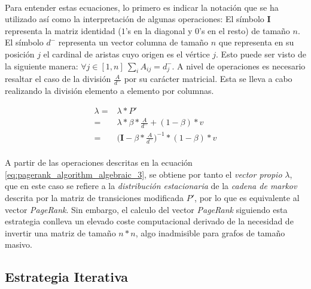 \documentclass{subfiles}
\begin{document}
        \paragraph{}
        Para entender estas ecuaciones, lo primero es indicar la notación que se ha utilizado así como la interpretación de algunas operaciones: El símbolo $\boldsymbol{I}$ representa la matriz identidad ($1$'s en la diagonal y $0$'s en el resto) de tamaño $n$. El símbolo $d^-$ representa un vector columna de tamaño $n$ que representa en su posición $j$ el cardinal de aristas cuyo origen es el vértice $j$. Esto puede ser visto de la siguiente manera: $\forall j \in [1,n] \ \sum_i A_{ij} = d^{-}_{j}$. A nivel de operaciones es necesario resaltar el caso de la división $\frac{A}{d^-}$ por su carácter matricial. Esta se lleva a cabo realizando la división elemento a elemento por columnas.

        \begin{align}
          \label{eq:pagerank_algorithm_algebraic_1}
          \lambda =& \lambda * P' \\
          \label{eq:pagerank_algorithm_algebraic_2}
                  =& \lambda * \beta * \frac{A}{d^-} + (1-\beta)*v \\
          \label{eq:pagerank_algorithm_algebraic_3}
                  =& \bigg(\boldsymbol{I} - \beta * \frac{A}{d^-}\bigg)^{-1} * (1-\beta)*v
        \end{align}

        \paragraph{}
        A partir de las operaciones descritas en la ecuación \eqref{eq:pagerank_algorithm_algebraic_3}, se obtiene por tanto el \emph{vector propio} $\lambda$, que en este caso se refiere a la \emph{distribución estacionaria} de la \emph{cadena de markov} descrita por la matriz de transiciones modificada $P'$, por lo que es equivalente al vector \emph{PageRank}. Sin embargo, el calculo del vector \emph{PageRank} siguiendo esta estrategia conlleva un elevado coste computacional derivado de la necesidad de invertir una matriz de tamaño $n*n$, algo inadmisible para grafos de tamaño masivo.

      \subsection{Estrategia Iterativa}
      \label{sec:pagerank_algorithm_iterative}
\end{document}
